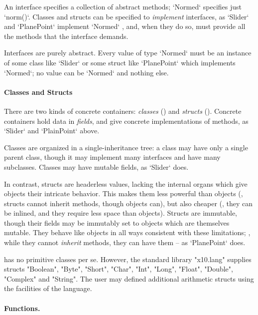 An \Xten{} interface specifies a collection of abstract methods; \xcd`Normed`
specifies just \xcd`norm()`. Classes and
structs can be specified to {\em implement} interfaces, as \xcd`Slider` and
\xcd`PlanePoint` implement \xcd`Normed` , and, when they do so, must provide
all the methods that the interface demands.

Interfaces are
purely abstract. Every value of type \xcd`Normed` must be an instance of some
class like \xcd`Slider` or some struct like \xcd`PlanePoint` which implements
\xcd`Normed`; no value can be \xcd`Normed` and nothing else. 


\paragraph{Classes and Structs}

There are two kinds of concrete containers: \emph{classes}
() and \emph{structs} (). Concrete
containers hold data in {\em fields}, and give concrete implementations of
methods, as \xcd`Slider` and \xcd`PlainPoint` above.

Classes are organized in a single-inheritance tree: a class may have only a
single parent class, though it may implement many interfaces and have many
subclasses. Classes may have mutable fields, as \xcd`Slider` does.

In contrast, structs are headerless values, lacking the internal organs
which give objects their intricate behavior.  This makes them less powerful
than objects (\eg, structs cannot inherit methods, though objects can), but also
cheaper (\eg, they can be inlined, and they require less space than objects).  
Structs are immutable, though their fields may be immutably set to objects
which are themselves mutable.  They behave like objects in all ways consistent
with these limitations; \eg, while they cannot {\em inherit} methods, they can
have them -- as \xcd`PlanePoint` does.

\Xten{} has no primitive classes per se. However, the standard library
\xcd"x10.lang" supplies structs \xcd"Boolean", \xcd"Byte", \xcd"Short",
\xcd"Char", \xcd"Int", \xcd"Long", \xcd"Float", \xcd"Double", \xcd"Complex"
and \xcd"String". The user may defined additional arithmetic structs using the
facilities of the language.



\paragraph{Functions.}

